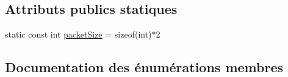 \subsection*{Attributs publics statiques}
\begin{DoxyCompactItemize}
\item 
static const int \hyperlink{classPacket_a4d3ec46364b14d6f59e550920ec9a78a}{packet\+Size} = sizeof(int)$\ast$2
\end{DoxyCompactItemize}


\subsection{Documentation des énumérations membres}
\hypertarget{classPacket_ae91c1d355e4c8f0bef5f893747473661}{}
